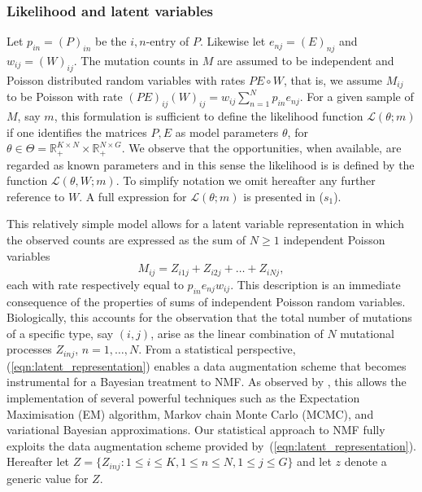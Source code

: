 \documentclass{bioinfo}
\begin{document}
\subsubsection{Likelihood and latent variables}
Let $p_{in} = (P)_{in}$ be the $i,n$-entry of $P$. Likewise let
$e_{nj} = (E)_{nj}$ and $w_{ij} = (W)_{ij}$.  The mutation counts in
$M$ are assumed to be independent and Poisson distributed random
variables with rates $PE\circ W$, that is, we assume $M_{ij}$ to be
Poisson with rate $(PE)_{ij}(W)_{ij} = w_{ij}\sum_{n=1}^N
p_{in}e_{nj}$. For a given sample of $M$, say $m$, this formulation is
sufficient to define the likelihood function $\mathcal L(\theta; m)$
if one identifies the matrices $P, E$ as model parameters $\theta$,
for $\theta \in \Theta = \mathbb R_+^{K\times N}\times \mathbb
R_+^{N\times G}$. We observe that the opportunities, when available,
are regarded as known parameters and in this sense the likelihood is
is  defined by the function $\mathcal L(\theta, W; m)$. To simplify 
notation we omit hereafter any further reference to $W$. A full expression
for $\mathcal L(\theta; m)$ is presented in ($s_1$).


This relatively simple model allows for a latent variable
representation in which the observed counts are expressed as the sum
of $N\geqslant 1$ independent Poisson variables
\begin{equation}
  \label{eqn:latent_representation}
   M_{ij} = Z_{i1j} + Z_{i2j} + \ldots + Z_{iNj},
\end{equation} 
each with rate respectively equal to $p_{in}e_{nj}w_{ij}$. This
description is an immediate consequence of the properties of sums of
independent Poisson random variables. Biologically, this accounts for
the observation that the total number of mutations of a specific type,
say $(i,j)$, arise as the linear combination of $N$ mutational
processes $Z_{inj}$, $n = 1, \ldots, N$. From a statistical
perspective, (\ref{eqn:latent_representation}) enables a data
augmentation scheme that becomes instrumental for a Bayesian treatment
to NMF. As observed by \cite{C}, this allows the implementation of
several powerful techniques such as the Expectation Maximisation (EM)
algorithm, Markov chain Monte Carlo (MCMC), and variational Bayesian
approximations.  Our statistical approach to NMF fully exploits the
data augmentation scheme provided
by~(\ref{eqn:latent_representation}).  Hereafter let $Z = \{Z_{inj}:
1\leqslant i\leqslant K, 1\leqslant n \leqslant N, 1\leqslant
j\leqslant G\}$ and let $z$ denote a generic value for $Z$.
\end{document}
